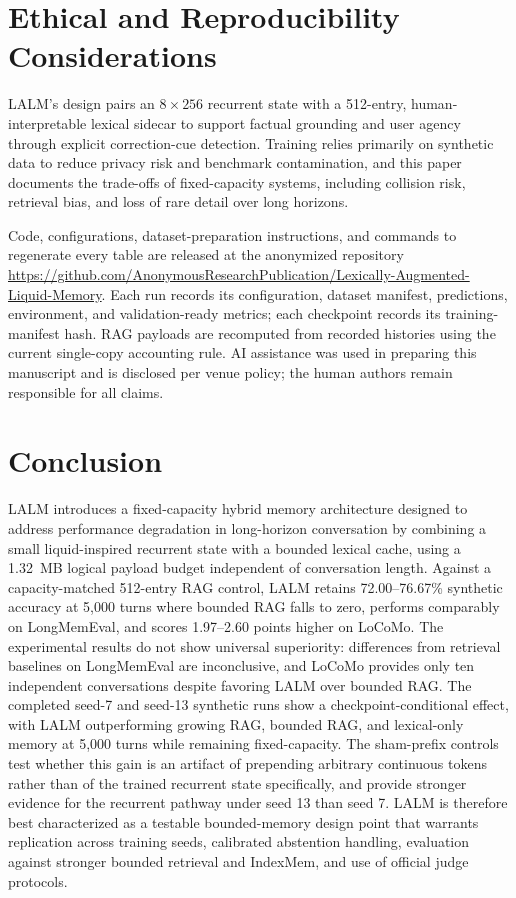 \documentclass[conference]{IEEEtran}
\begin{document}
\section{Ethical and Reproducibility Considerations}
\label{sec:ethics}
LALM's design pairs an $8\times256$ recurrent state with a 512-entry, human-interpretable lexical sidecar to support factual grounding and user agency through explicit correction-cue detection. Training relies primarily on synthetic data to reduce privacy risk and benchmark contamination, and this paper documents the trade-offs of fixed-capacity systems, including collision risk, retrieval bias, and loss of rare detail over long horizons.

Code, configurations, dataset-preparation instructions, and commands to regenerate every table are released at the anonymized repository \url{https://github.com/AnonymousResearchPublication/Lexically-Augmented-Liquid-Memory}. Each run records its configuration, dataset manifest, predictions, environment, and validation-ready metrics; each checkpoint records its training-manifest hash. RAG payloads are recomputed from recorded histories using the current single-copy accounting rule. AI assistance was used in preparing this manuscript and is disclosed per venue policy; the human authors remain responsible for all claims.

\section{Conclusion}
LALM introduces a fixed-capacity hybrid memory architecture designed to address performance degradation in long-horizon conversation by combining a small liquid-inspired recurrent state with a bounded lexical cache, using a 1.32~MB logical payload budget independent of conversation length. Against a capacity-matched 512-entry RAG control, LALM retains 72.00--76.67\% synthetic accuracy at 5,000 turns where bounded RAG falls to zero, performs comparably on LongMemEval, and scores 1.97--2.60 points higher on LoCoMo. The experimental results do not show universal superiority: differences from retrieval baselines on LongMemEval are inconclusive, and LoCoMo provides only ten independent conversations despite favoring LALM over bounded RAG. The completed seed-7 and seed-13 synthetic runs show a checkpoint-conditional effect, with LALM outperforming growing RAG, bounded RAG, and lexical-only memory at 5,000 turns while remaining fixed-capacity. The sham-prefix controls test whether this gain is an artifact of prepending arbitrary continuous tokens rather than of the trained recurrent state specifically, and provide stronger evidence for the recurrent pathway under seed 13 than seed 7. LALM is therefore best characterized as a testable bounded-memory design point that warrants replication across training seeds, calibrated abstention handling, evaluation against stronger bounded retrieval and IndexMem, and use of official judge protocols.



\end{document}
